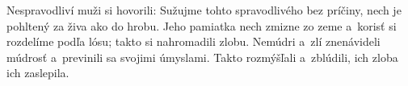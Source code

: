 Nespravodliví muži si hovorili:
Sužujme tohto spravodlivého bez príčiny, nech je pohltený za živa ako do hrobu. Jeho pamiatka nech zmizne zo zeme a~korisť si rozdelíme podľa lósu; takto si nahromadili zlobu.
\versseparator 
Nemúdri a~zlí znenávideli múdrosť a~previnili sa svojimi úmyslami.
\versseparator
Takto rozmýšľali a~zblúdili, ich zloba ich zaslepila.
